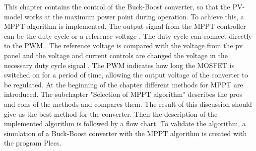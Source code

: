 This chapter contains the control of the Buck-Boost converter, so that the PV-model works at the maximum power point during operation. To achieve this, a MPPT algorithm is implemented. The output signal from the MPPT controller can be the duty cycle or a reference voltage . The duty cycle can connect directly to the PWM . The reference voltage is compared with the voltage from the pv panel and the voltage and current controls are changed the voltage in the necessary duty cycle signal . The PWM indicates how long the MOSFET is switched on for a period of time, allowing the output voltage of the converter to be regulated.\newline
At the beginning of the chapter different methods for MPPT are introduced. The subchapter "Selection of MPPT algorithm" describes the pros and cons of the methods and compares them. The result of this discussion should give us the best method for the converter. Then the description of the implemented algorithm is followed by a flow chart. To validate the algorithm, a simulation of a Buck-Boost converter with the MPPT algorithm is created with the program Plecs.
